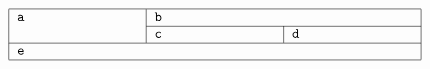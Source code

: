 \documentclass[varwidth]{standalone}
\begin{document}
\begin{displaymath}\begin{tabular}{|p{0.25\columnwidth}|p{0.25\columnwidth}|p{0.25\columnwidth}|p{0.25\columnwidth}|p{0.25\columnwidth}|}\hline $\texttt{a}$ & \multicolumn{2}{l|}{$\texttt{b}$} \\ \cline{2-3} & $\texttt{c}$ & $\texttt{d}$ \\ \cline{1-3}\multicolumn{3}{|l|}{$\texttt{e}$} \\ \hline \end{tabular}\end{displaymath}
\end{document}
